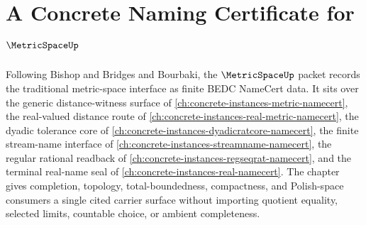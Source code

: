 \chapter{A Concrete Naming Certificate for $\MetricSpaceUp$}
\label{ch:concrete-instances-metric-space-namecert}

Following Bishop and Bridges and Bourbaki, the $\MetricSpaceUp$ packet records the traditional metric-space interface as finite BEDC NameCert data. It sits over the generic distance-witness surface of \autoref{ch:concrete-instances-metric-namecert}, the real-valued distance route of \autoref{ch:concrete-instances-real-metric-namecert}, the dyadic tolerance core of \autoref{ch:concrete-instances-dyadicratcore-namecert}, the finite stream-name interface of \autoref{ch:concrete-instances-streamname-namecert}, the regular rational readback of \autoref{ch:concrete-instances-regseqrat-namecert}, and the terminal real-name seal of \autoref{ch:concrete-instances-real-namecert}. The chapter gives completion, topology, total-boundedness, compactness, and Polish-space consumers a single cited carrier surface without importing quotient equality, selected limits, countable choice, or ambient completeness.

